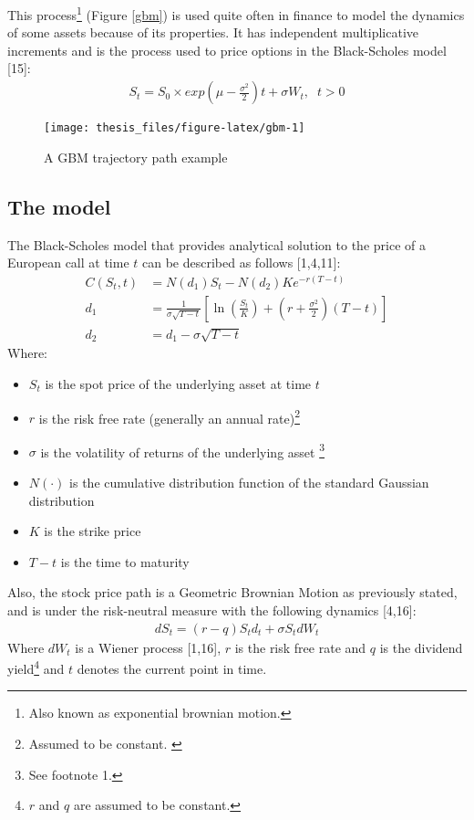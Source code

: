 \documentclass[12pt,twoside]{reedthesis}
\providecommand{\tightlist}{%
  \setlength{\itemsep}{0pt}\setlength{\parskip}{0pt}}
\theoremstyle{definition}
\theoremstyle{definition}
\theoremstyle{remark}
\begin{document}
  This process\footnote{Also known as exponential brownian motion.}
  (Figure \ref{gbm}) is used quite often in finance to model the dynamics
  of some assets because of its properties. It has independent
  multiplicative increments and is the process used to price options in
  the Black-Scholes model {[}15{]}:
  \begin{align}
  S_t = S_0 \times exp{\left(\mu - \frac{\sigma^2}{2} \right) t + \sigma W_t}, \;\; t > 0
  \end{align}
  \begin{figure}
  
  {\centering \texttt{[image: thesis\_files/figure-latex/gbm-1]} 
  
  }
  
  \caption{A GBM trajectory path example \label{gbm}}\label{fig:gbm}
  \end{figure}
  \subsection{The model}\label{the-model}
  
  The Black-Scholes model that provides analytical solution to the price
  of a European call at time \(t\) can be described as follows
  {[}1,4,11{]}:
  \begin{align}
  C(S_{t},t)&=N(d_{1})S_{t}-N(d_{2})Ke^{-r(T-t)}\\[10pt]
  d_{1}&={\frac {1}{\sigma {\sqrt {T-t}}}}\left[\ln \left({\frac {S_{t}}{K}}\right)+\left(r+{\frac {\sigma ^{2}}{2}}\right)(T-t)\right]\\[10pt]
  d_{2}&=d_{1}-\sigma {\sqrt {T-t}}
  \end{align}
  \noindent
  Where:
  \begin{itemize}
  \tightlist
  \item
    \(S_{t}\) is the spot price of the underlying asset at time \(t\)
  \item
    \(r\) is the risk free rate (generally an annual
    rate)\footnote{Assumed to be constant. \label{teste}}
  \item
    \(\sigma\) is the volatility of returns of the underlying asset
    \footnote{See footnote 1.}
  \item
    \(N(\cdot )\) is the cumulative distribution function of the standard
    Gaussian distribution
  \item
    \(K\) is the strike price
  \item
    \(T-t\) is the time to maturity
  \end{itemize}
  \noindent
  Also, the stock price path is a Geometric Brownian Motion as previously
  stated, and is under the risk-neutral measure with the following
  dynamics {[}4,16{]}:
  \begin{align}
  dS_{t} = (r-q)S_td_t+\sigma S_t dW_t
  \end{align}
  \noindent
  Where \(dW_t\) is a Wiener process {[}1,16{]}, \(r\) is the risk free
  rate and \(q\) is the dividend
  yield\footnote{$r$ and $q$ are assumed to be constant.} and \(t\)
  denotes the current point in time.
  
\end{document}
